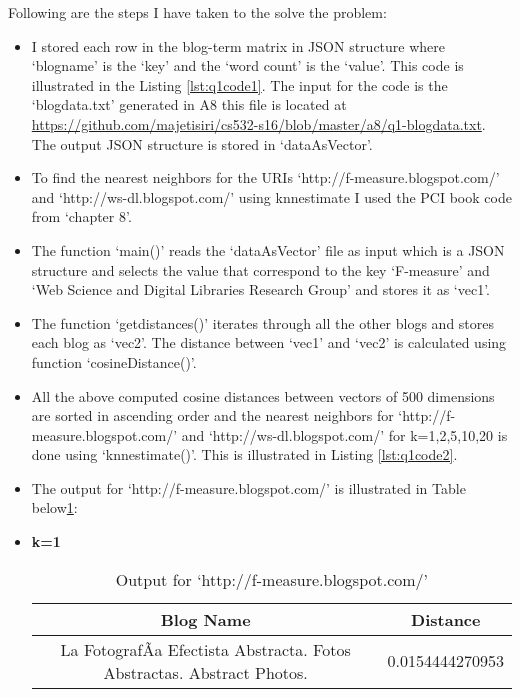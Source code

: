 \newpage
Following are the steps I have taken to the solve the problem:
\begin{itemize}
\item I stored each row in the blog-term matrix in JSON structure where `blogname' is the `key' and the `word count' is the `value'. This code is  illustrated in the Listing \ref{lst:q1code1}. The input for the code is the `blogdata.txt' generated in A8 this file is located at \url{https://github.com/majetisiri/cs532-s16/blob/master/a8/q1-blogdata.txt}. The output JSON structure is stored in `dataAsVector'.
\item To find the nearest neighbors for the URIs `http://f-measure.blogspot.com/' and `http://ws-dl.blogspot.com/' using knnestimate I used the PCI book code  from `chapter 8'. 
\item The function `main()' reads the `dataAsVector' file as input which is a JSON structure and selects the value that correspond to the key `F-measure' and `Web Science and Digital Libraries Research Group' and stores it as `vec1'.
\item  The function `getdistances()' iterates through all the other blogs and stores each blog as `vec2'. The distance between `vec1' and `vec2' is calculated using function `cosineDistance()'. 
\item All the above computed cosine distances between vectors of 500 dimensions are sorted in ascending order and the nearest neighbors for `http://f-measure.blogspot.com/' and `http://ws-dl.blogspot.com/' for k={1,2,5,10,20} is done using `knnestimate()'. This is illustrated in Listing \ref{lst:q1code2}.
\item The output for `http://f-measure.blogspot.com/' is illustrated in Table below\ref{q1table1}:
\item \textbf{ k=1}
\begin{table}
\caption{Output for `http://f-measure.blogspot.com/'}
\label{q1table1}
\begin{center}
\hspace{-2cm}
\begin{tabular}{|c|c|}
\hline
 \textbf{Blog Name} & \textbf{Distance}\\ \hline
La FotografÃ­a Efectista Abstracta. Fotos Abstractas. Abstract  Photos. & 0.0154444270953	 \\ \hline
\end{tabular}
\end{center}
\end{table}



\end{itemize}
